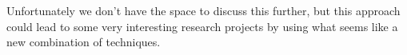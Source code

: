 



        Unfortunately we don't have the space to discuss this further, but this approach could lead to some very interesting research projects by using what seems like a new combination of techniques.


